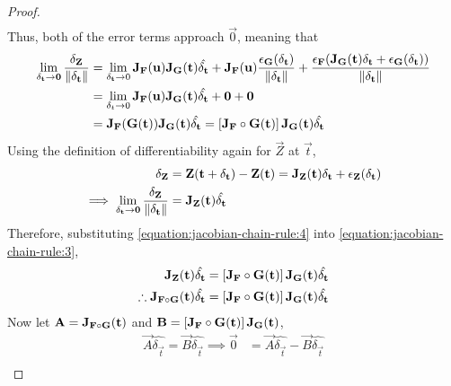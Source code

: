 \begin{lemma}
\begin{proof}
\begin{align*}
        \end{align*}
        Thus, both of the error terms approach $\vec{0}$, meaning that
        \begin{align}
            \notag\lim_{\delta_{\mathbf{t}}\rightarrow\mathbf{0}}\frac{\delta_{\mathbf{Z}}}{\lVert\delta_{\mathbf{t}}\rVert}&=\lim_{\delta_{\mathbf{t}}\rightarrow0}\mathbf{J}_{\mathbf{F}}(\mathbf{u})\mathbf{J}_{\mathbf{G}}(\mathbf{t})\hat{\delta_{\mathbf{t}}}+\mathbf{J}_{\mathbf{F}}(\mathbf{u})\frac{\epsilon_{\mathbf{G}}(\delta_{\mathbf{t}})}{\lVert\delta_{\mathbf{t}}\rVert}+\frac{\epsilon_{\mathbf{F}}(\mathbf{J}_{\mathbf{G}}(\mathbf{t})\delta_{\mathbf{t}}+\epsilon_{\mathbf{G}}(\delta_{\mathbf{t}}))}{\lVert\delta_{\mathbf{t}}\rVert}\\
            \notag&=\lim_{\delta_t\rightarrow0}\mathbf{J}_{\mathbf{F}}(\mathbf{u})\mathbf{J}_{\mathbf{G}}(\mathbf{t})\hat{\delta_{\mathbf{t}}}+\mathbf{0}+\mathbf{0}\\
            \label{equation:jacobian-chain-rule:3}&=\mathbf{J}_{\mathbf{F}}(\mathbf{G}(\mathbf{t}))\mathbf{J}_{\mathbf{G}}(\mathbf{t})\hat{\delta_{\mathbf{t}}}=\left[\mathbf{J}_{\mathbf{F}}\circ\mathbf{G}(\mathbf{t})\right]\mathbf{J}_{\mathbf{G}}(\mathbf{t})\hat{\delta_{\mathbf{t}}}
        \end{align}
        Using the definition of differentiability again for $\vec{Z}$ at $\vec{t}$,
        \begin{align}
            \notag\delta_{\mathbf{Z}}&=\mathbf{Z}(\mathbf{t}+\delta_{\mathbf{t}})-\mathbf{Z}(\mathbf{t})=\mathbf{J}_{\mathbf{Z}}(\mathbf{t})\delta_{\mathbf{t}}+\epsilon_{\mathbf{Z}}(\delta_{\mathbf{t}})\\
            \label{equation:jacobian-chain-rule:4}\implies\lim_{\delta_{\mathbf{t}}\rightarrow\mathbf{0}}\frac{\delta_{\mathbf{Z}}}{\lVert\delta_{\mathbf{t}}\rVert}&=\mathbf{J}_{\mathbf{Z}}(\mathbf{t})\hat{\delta_{\mathbf{t}}}
        \end{align}
        Therefore, substituting \eqref{equation:jacobian-chain-rule:4} into \eqref{equation:jacobian-chain-rule:3},
        \begin{align*}
            \mathbf{J}_{\mathbf{Z}}(\mathbf{t})\hat{\delta_{\mathbf{t}}}&=\left[\mathbf{J}_{\mathbf{F}}\circ\mathbf{G}(\mathbf{t})\right]\mathbf{J}_{\mathbf{G}}(\mathbf{t})\hat{\delta_{\mathbf{t}}}\\
            \therefore\mathbf{J}_{\mathbf{F}\circ\mathbf{G}}(\mathbf{t})\hat{\delta_{\mathbf{t}}}&=\left[\mathbf{J}_{\mathbf{F}}\circ\mathbf{G}(\mathbf{t})\right]\mathbf{J}_{\mathbf{G}}(\mathbf{t})\hat{\delta_{\mathbf{t}}}
        \end{align*}
        Now let $\mathbf{A}=\mathbf{J}_{\mathbf{F}\circ\mathbf{G}}(\mathbf{t})$ and $\mathbf{B}=\left[\mathbf{J}_{\mathbf{F}}\circ\mathbf{G}(\mathbf{t})\right]\mathbf{J}_{\mathbf{G}}(\mathbf{t})$,
        \begin{align*}
            \vec{A}\hat{\delta_\vec{t}}=\vec{B}\hat{\delta_\vec{t}}\implies\vec{0}&=\vec{A}\hat{\delta_\vec{t}}-\vec{B}\hat{\delta_\vec{t}}\\

\end{align*}
\end{proof}
\end{lemma}
